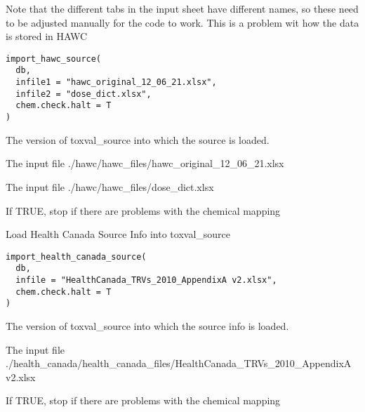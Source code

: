 \documentclass[letterpaper]{book}
\begin{document}
%
\begin{Description}\relax
Note that the different tabs in the input sheet have different names, so these need
to be adjusted manually for the code to work. This is a problem wit how the data
is stored in HAWC
\end{Description}
%
\begin{Usage}
\begin{verbatim}
import_hawc_source(
  db,
  infile1 = "hawc_original_12_06_21.xlsx",
  infile2 = "dose_dict.xlsx",
  chem.check.halt = T
)
\end{verbatim}
\end{Usage}
%
\begin{Arguments}
\begin{ldescription}
\item[\code{db}] The version of toxval\_source into which the source is loaded.

\item[\code{infile1}] The input file ./hawc/hawc\_files/hawc\_original\_12\_06\_21.xlsx

\item[\code{infile2}] The input file ./hawc/hawc\_files/dose\_dict.xlsx

\item[\code{chem.check.halt}] If TRUE, stop if there are problems with the chemical mapping
\end{ldescription}
\end{Arguments}
%
\begin{Description}\relax
Load Health Canada Source Info into toxval\_source
\end{Description}
%
\begin{Usage}
\begin{verbatim}
import_health_canada_source(
  db,
  infile = "HealthCanada_TRVs_2010_AppendixA v2.xlsx",
  chem.check.halt = T
)
\end{verbatim}
\end{Usage}
%
\begin{Arguments}
\begin{ldescription}
\item[\code{db}] The version of toxval\_source into which the source info is loaded.

\item[\code{infile}] The input file ./health\_canada/health\_canada\_files/HealthCanada\_TRVs\_2010\_AppendixA v2.xlsx

\item[\code{chem.check.halt}] If TRUE, stop if there are problems with the chemical mapping
\end{ldescription}
\end{Arguments}
\end{document}

